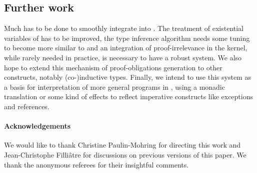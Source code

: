\documentclass{llncs}
\begin{document}
\subsection{Further work}
Much has to be done to smoothly integrate \Russell into \Coq. The
treatment of existential variables of \Coq has to be improved, the
type inference algorithm needs some tuning to become more similar to \ML
and an integration of proof-irrelevance in the kernel, while rarely needed in
practice, is necessary to have a robust system.
We also hope to extend this mechanism of proof-obligations generation to other
constructs, notably (co-)inductive types. Finally, we intend to use this system as a
basis for interpretation of more general \ML{} programs in \Coq, using a monadic
translation or some kind of effects to reflect imperative constructs
like exceptions and references.

\paragraph{Acknowledgements}
We would like to thank Christine Paulin-Mohring for directing this work and
Jean-Christophe Filli\^atre for discussions on previous versions of this
paper. We thank the anonymous referees for their insightful comments.


\end{document}
